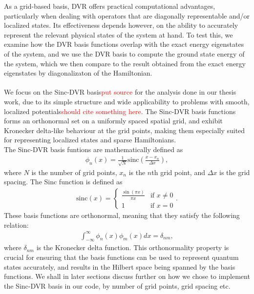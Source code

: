 \documentclass{subfiles}
\begin{document}
As a grid-based basis, DVR offers practical computational advantages, particularly when dealing with operators that are diagonally representable and/or localized states. Its effectiveness depends however, on the ability to accurately represent the relevant physical states of the system at hand. To test this, we examine how the DVR basis functions overlap with the exact energy eigenstates of the system, and we use the DVR basis to compute the ground state energy of the system, which we then compare to the result obtained from the exact energy eigenstates by diagonalizaton of the Hamiltonian. 
\\
\\
We focus on the Sinc-DVR basis\textcolor{red}{put source} for the analysis done in our thesis work, due to its simple structure and wide applicability to problems with smooth, localized potentials\textcolor{red}{should cite something here}. The Sinc-DVR basis functions forms an orthonormal set on a uniformly spaced spatial grid, and exhibit Kronecker delta-like behaviour at the grid points, making them especially suited for representing localized states and sparse Hamiltonians.
\\ The Sinc-DVR basis funtions are mathematically defined as
\begin{align*}
    \phi_n(x) = \frac{1}{\sqrt{N}} \text{sinc}\left(\frac{x - x_n}{\Delta x}\right)\label{eq:sinc_dvr},
\end{align*}
where $N$ is the number of grid points, $x_n$ is the $n$th grid point, and $\Delta x$ is the grid spacing. The Sinc function is defined as
\begin{align*}
    \text{sinc}(x) = \begin{cases}
        \frac{\sin(\pi x)}{\pi x} & \text{if } x \neq 0 \\
        1 & \text{if } x = 0
    \end{cases}.
\end{align*}
These basis functions are orthonormal, meaning that they satisfy the following relation:
\begin{align*}
    \int_{-\infty}^{\infty} \phi_n(x) \phi_m(x) dx = \delta_{nm},
\end{align*}
where $\delta_{nm}$ is the Kronecker delta function. This orthonormality property is crucial for ensuring that the basis functions can be used to represent quantum states accurately, and results in the Hilbert space being spanned by the basis functions. We shall in later sections discuss further on how we chose to implement the Sinc-DVR basis in our code, by number of grid points, grid spacing etc. 
\end{document}
